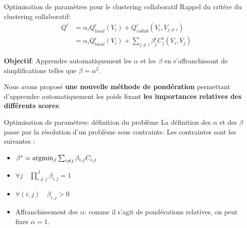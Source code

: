 \documentclass[hyperref={pdfpagelabels=false}]{beamer}
\begin{document}
    \begin{frame}{Optimisation de paramètres pour le clustering collaboratif}
        Rappel du critère du clustering collaboratif:
        \begin{align*}
            Q^i &= \alpha_i Q^i_{local}(V_i) + Q^i_{collab}(V_i, 
            V_{j\neq i})\\
            &= \alpha_i Q^i_{local}(V_i) + \sum_{j\neq i} \beta^i_j 
            C_j^i(V_i, V_j)
        \end{align*}

        \textbf{Objectif}: Apprendre automatiquement les $\alpha$ et les
        $\beta$ en s'affranchissant de simplifications telles que $\beta =
        \alpha^2$.

        Nous avons proposé \textbf{une nouvelle méthode de pondération} 
        permettant d'apprendre automatiquement les poids fixant \textbf{les 
        importances relatives des différents scores}.\\
    \end{frame}

    \begin{frame}{Optimisation de paramètres: définition du problème}
        La définition des $\alpha$ et des $\beta$ passe par la résolution
        d'un problème sous contrainte. Les contraintes sont les suivantes :

        \begin{itemize}
            \item<2-> $\beta^* =  
                \operatornamewithlimits{argmin}_{\beta}  \sum_{i \neq j}
        \beta_{i,j}  C _{i,j} $
            \item<3-> $\forall j \quad \prod_{i \neq j}^J \beta_{i,j} = 
                1$
            \item<4-> $\forall (i,j) \quad \beta_{i,j} >0$
            \item<5->{Affranchissement des $\alpha$: comme il s'agit de 
                pondérations relatives, on peut fixer $\alpha=1$.}
        \end{itemize}

    \end{frame}
\end{document}
